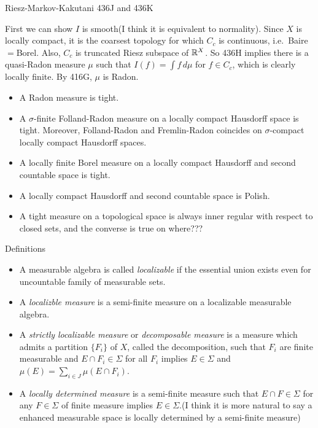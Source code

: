 \documentclass{../../large}
\begin{document}
Riesz-Markov-Kakutani 436J and 436K
\begin{pf}
First we can show $I$ is smooth(I think it is equivalent to normality).
Since $X$ is locally compact, it is the coarsest topology for which $C_c$ is continuous, i.e.~Baire$=$Borel.
Also, $C_c$ is truncated Riesz subspace of $\mathbb{R}^X$.
So 436H implies there is a quasi-Radon measure $\mu$ such that $I(f)=\int f\,d\mu$ for $f\in C_c$, which is clearly locally finite.
By 416G, $\mu$ is Radon.
\end{pf}

\begin{itemize}
\item A Radon measure is tight.
\item A $\sigma$-finite Folland-Radon measure on a locally compact Hausdorff space is tight. Moreover, Folland-Radon and Fremlin-Radon coincides on $\sigma$-compact locally compact Hausdorff spaces.
\item A locally finite Borel measure on a locally compact Hausdorff and second countable space is tight.
\item A locally compact Hausdorff and second countable space is Polish.
\item A tight measure on a topological space is always inner regular with respect to closed sets, and the converse is true on where???
\end{itemize}

Definitions
\begin{itemize}
\item A measurable algebra is called \emph{localizable} if the essential union exists even for uncountable family of measurable sets.
\item A \emph{localizble measure} is a semi-finite measure on a localizable measurable algebra.
\item A \emph{strictly localizable measure} or \emph{decomposable measure} is a measure which admits a partition $\{F_i\}$ of $X$, called the decomposition, such that $F_i$ are finite measurable and $E\cap F_i\in\Sigma$ for all $F_i$ implies $E\in\Sigma$ and $\mu(E)=\sum_{i\in J}\mu(E\cap F_i)$.
\item A \emph{locally determined measure} is a semi-finite measure such that $E\cap F\in\Sigma$ for any $F\in\Sigma$ of finite measure implies $E\in\Sigma$.(I think it is more natural to say a enhanced measurable space is locally determined by a semi-finite measure)
\end{itemize}
\end{document}
